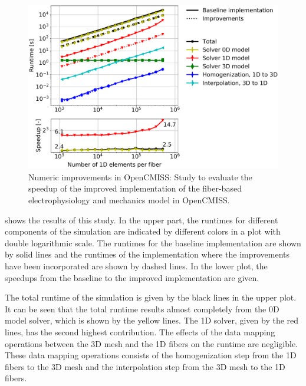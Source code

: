 \begin{figure}
  \centering%
  \includegraphics[width=\textwidth]{images/results/studies/opencmiss_cuboid_serial_scaling_comparison_aggressive.pdf}%
  \caption{Numeric improvements in OpenCMISS: Study to evaluate the speedup of the improved implementation of the fiber-based electrophysiology and mechanics model in OpenCMISS.}%
  \label{fig:opencmiss_improvements}%
\end{figure}%

 shows the results of this study. In the upper part, the runtimes for different components of the simulation are indicated by different colors in a plot with double logarithmic scale. The runtimes for the baseline implementation are shown by solid lines and the runtimes of the implementation where the improvements have been incorporated are shown by dashed lines. In the lower plot, the speedups from the baseline to the improved implementation are given.

The total runtime of the simulation is given by the black lines in the upper plot. It can be seen that the total runtime results almost completely from the 0D model solver, which is shown by the yellow lines. The 1D solver, given by the red lines, has the second highest contribution. The effects of the data mapping operations between the 3D mesh and the 1D fibers on the runtime are negligible. These data mapping operations consists of the homogenization step from the 1D fibers to the 3D mesh and the interpolation step from the 3D mesh to the 1D fibers.

